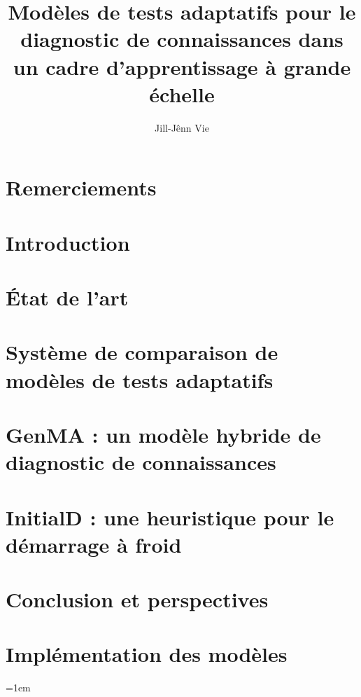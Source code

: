 \documentclass[12pt,a4paper]{book}
\title{Modèles de tests adaptatifs pour le diagnostic de connaissances dans un cadre d'apprentissage à grande échelle}
\author{Jill-Jênn Vie}
\begin{document}

\restoregeometry

\chapter*{Remerciements}


\printglossaries
\printnomenclature

\clearpage
\tableofcontents

\chapter{Introduction}


\chapter{État de l'art}


\chapter{Système de comparaison de modèles de tests adaptatifs}



\chapter{GenMA : un modèle hybride de diagnostic de connaissances}




\chapter{InitialD : une heuristique pour le démarrage à froid}



\chapter{Conclusion et perspectives}


%

\clearpage
\listoffigures
\listoftables

\appendix

\chapter{Implémentation des modèles}


\emergencystretch=1em
\printbibliography
\end{document}
